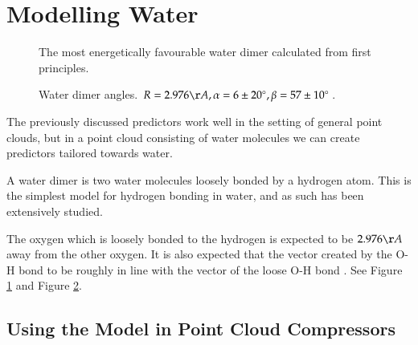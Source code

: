 \documentclass{report}
\newcommand{\degree}{\ensuremath{^\circ}}
\begin{document}
\section{Modelling Water}

\begin{figure}[h]
\centering
{}
\caption{The most energetically favourable water dimer calculated from first
  principles. \citep{watermolecule}}
\label{fig:dimer}
\end{figure}

\begin{figure}[h]
\centering
{}
\caption{Water dimer angles. $R = 2.976\AA, \alpha = 6 \pm 20\degree, \beta =
  57 \pm 10\degree$. \citep{watermolecule}}
\label{fig:dimer-angle}
\end{figure}

The previously discussed predictors work well in the setting of general point
clouds, but in a point cloud consisting of water molecules we can create
predictors tailored towards water.

A water dimer is two water molecules loosely bonded by a hydrogen atom. This
is the simplest model for hydrogen bonding in water, and as such has been
extensively studied.

The oxygen which is loosely bonded to the hydrogen is expected to be
$2.976\AA$ away from the other oxygen. It is also expected that the vector
created by the O-H bond to be roughly in line with the vector of the loose O-H
bond \citep{watermolecule}. See Figure \ref{fig:dimer} and Figure
\ref{fig:dimer-angle}.

\subsection{Using the Model in Point Cloud Compressors}
\end{document}
